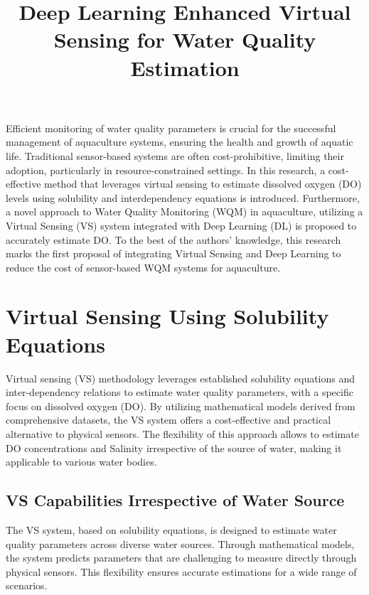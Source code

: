 \documentclass[a4paper, 11pt]{article}
\begin{document}
	
	\title{Deep Learning Enhanced Virtual Sensing for Water Quality Estimation}
	\maketitle
	
	Efficient monitoring of water quality parameters is crucial for the successful management of aquaculture systems, ensuring the health and growth of aquatic life. Traditional sensor-based systems are often cost-prohibitive, limiting their adoption, particularly in resource-constrained settings. In this research, a cost-effective method that leverages virtual sensing to estimate dissolved oxygen (DO) levels using solubility and interdependency equations is introduced. Furthermore, a novel approach to Water Quality Monitoring (WQM) in aquaculture, utilizing a Virtual Sensing (VS) system integrated with Deep Learning (DL) is proposed to accurately estimate DO. To the best of the authors’ knowledge, this research marks the first proposal of integrating Virtual Sensing and Deep Learning to reduce the cost of sensor-based WQM systems for aquaculture.
	
	\section*{Virtual Sensing Using Solubility Equations}
	
	Virtual sensing (VS) methodology leverages established solubility equations and inter-dependency relations to estimate water quality parameters, with a specific focus on dissolved oxygen (DO). By utilizing mathematical models derived from comprehensive datasets, the VS system offers a cost-effective and practical alternative to physical sensors. The flexibility of this approach allows to estimate DO concentrations and Salinity irrespective of the source of water, making it applicable to various water bodies.
	
	\subsection*{VS Capabilities Irrespective of Water Source}
	
	The VS system, based on solubility equations, is designed to estimate water quality parameters across diverse water sources. Through mathematical models, the system predicts parameters that are challenging to measure directly through physical sensors. This flexibility ensures accurate estimations for a wide range of scenarios.
	
\end{document}
